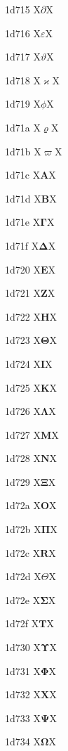 \documentclass[11pt]{article}
\begin{document}
1d715 X{\ensuremath{\mathit{\partial}}}X

1d716 X{\ensuremath{\mathit{\varepsilon}}}X

1d717 X{\ensuremath{\mathit{\vartheta}}}X

1d718 X{\ensuremath{\mathit{\varkappa}}}X

1d719 X{\ensuremath{\mathit{\phi}}}X

1d71a X{\ensuremath{\mathit{\varrho}}}X

1d71b X{\ensuremath{\mathit{\varpi}}}X

1d71c X{\ensuremath{\boldsymbol{A}}}X

1d71d X{\ensuremath{\boldsymbol{B}}}X

1d71e X{\ensuremath{\boldsymbol{\Gamma}}}X

1d71f X{\ensuremath{\boldsymbol{\Delta}}}X

1d720 X{\ensuremath{\boldsymbol{E}}}X

1d721 X{\ensuremath{\boldsymbol{Z}}}X

1d722 X{\ensuremath{\boldsymbol{H}}}X

1d723 X{\ensuremath{\boldsymbol{\Theta}}}X

1d724 X{\ensuremath{\boldsymbol{I}}}X

1d725 X{\ensuremath{\boldsymbol{K}}}X

1d726 X{\ensuremath{\boldsymbol{\Lambda}}}X

1d727 X{\ensuremath{\boldsymbol{M}}}X

1d728 X{\ensuremath{\boldsymbol{N}}}X

1d729 X{\ensuremath{\boldsymbol{\Xi}}}X

1d72a X{\ensuremath{\boldsymbol{O}}}X

1d72b X{\ensuremath{\boldsymbol{\Pi}}}X

1d72c X{\ensuremath{\boldsymbol{R}}}X

1d72d X{\ensuremath{\boldsymbol{\varTheta}}}X

1d72e X{\ensuremath{\boldsymbol{\Sigma}}}X

1d72f X{\ensuremath{\boldsymbol{T}}}X

1d730 X{\ensuremath{\boldsymbol{\Upsilon}}}X

1d731 X{\ensuremath{\boldsymbol{\Phi}}}X

1d732 X{\ensuremath{\boldsymbol{X}}}X

1d733 X{\ensuremath{\boldsymbol{\Psi}}}X

1d734 X{\ensuremath{\boldsymbol{\Omega}}}X
\end{document}
